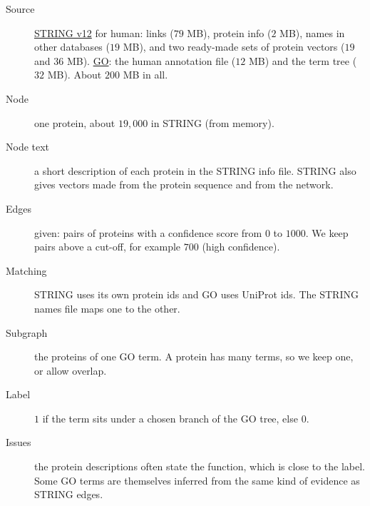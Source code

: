 \documentclass[11pt]{article}
\begin{document}
\begin{description}
\item[Source] \href{https://version-12-0.string-db.org/cgi/download?species_text=Homo+sapiens}{STRING v12}
for human: links ($79$ MB), protein info ($2$ MB), names in other databases ($19$ MB), and two
ready-made sets of protein vectors ($19$ and $36$ MB).
\href{https://geneontology.org/docs/download-go-annotations/downloads/}{GO}: the human
annotation file ($12$ MB) and the term tree ($32$ MB). About $200$ MB in all.
\item[Node] one protein, about $19{,}000$ in STRING (from memory).
\item[Node text] a short description of each protein in the STRING info file. STRING also gives
vectors made from the protein sequence and from the network.
\item[Edges] given: pairs of proteins with a confidence score from $0$ to $1000$. We keep pairs
above a cut-off, for example $700$ (high confidence).
\item[Matching] STRING uses its own protein ids and GO uses UniProt ids. The STRING names file
maps one to the other.
\item[Subgraph] the proteins of one GO term. A protein has many terms, so we keep one, or allow
overlap.
\item[Label] $1$ if the term sits under a chosen branch of the GO tree, else $0$.
\item[Issues] the protein descriptions often state the function, which is close to the label.
Some GO terms are themselves inferred from the same kind of evidence as STRING edges.
\end{description}
\end{document}
